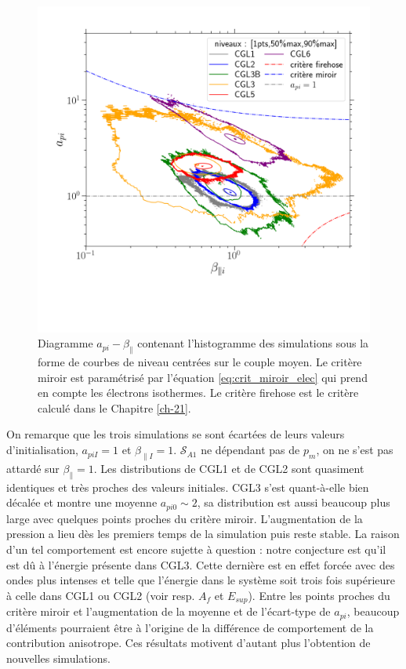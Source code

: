  \begin{figure}[!ht]
  \centering
 \includegraphics[width=0.8\linewidth,trim=1cm 7cm 2cm 1cm, clip=true]{./Mainmatter/Part_3/images_ch3/diag_apbeta}
 \cprotect\caption{Diagramme \ensuremath{a_{pi}-\beta_{\parallel}} contenant l'histogramme  des simulations sous la forme de courbes de niveau centrées sur le couple moyen. Le critère miroir est paramétrisé par l'équation \eqref{eq:crit_miroir_elec} qui prend en compte les électrons isothermes. Le critère firehose est le critère  calculé dans le Chapitre \ref{ch-21}. }
 \label{fig:diag_simu_CGL}
 \end{figure} 
 
 On remarque que les trois simulations se sont écartées de leurs valeurs d'initialisation, $a_{piI} = 1$ et $\beta_{\parallel I} = 1$. $ \mathcal{S}_{A1}$ ne dépendant pas de $p_m$, on ne s'est pas attardé sur $\beta_{\parallel} = 1$.  Les distributions de CGL1 et de CGL2 sont quasiment identiques et très proches des valeurs initiales. CGL3 s'est quant-à-elle bien décalée et montre une moyenne $a_{pi0}\sim 2$, sa distribution est aussi beaucoup plus large avec quelques points proches du critère miroir. L'augmentation de la pression a lieu dès les premiers temps de la simulation puis reste stable. La raison d'un tel comportement est encore sujette à question : notre conjecture est qu'il est dû à l'énergie présente dans CGL3. Cette dernière est en effet forcée avec des ondes plus intenses et telle que l'énergie dans le système soit trois fois supérieure à celle dans CGL1 ou CGL2 (voir resp. $A_f$ et $E_{sup}$). Entre les points proches du critère miroir et l'augmentation de la moyenne et de l'écart-type de $a_{pi}$, beaucoup d'éléments pourraient être à l'origine de la différence de comportement de la contribution anisotrope. Ces résultats motivent d'autant plus l'obtention de nouvelles simulations. 
 
